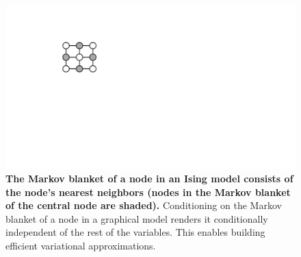 \begin{figure}[t!]
  \centering
  \includegraphics[height=0.2\paperheight]{ch-hvm/fig/markov-blanket-ising.pdf}
  \caption[Markov blanket of a random variable in an Ising model]{
  \textbf{The Markov blanket of a node in an Ising model consists of the node's nearest neighbors (nodes in the Markov blanket of the central node are shaded).} Conditioning on the Markov blanket of a node in a graphical model renders it conditionally independent of the rest of the variables. This enables building efficient variational approximations.}
  \label{fig:markov-blanket-ising}
\end{figure}